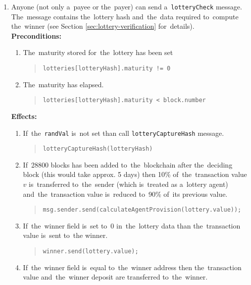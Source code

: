 \documentclass[a4paper]{article}
\begin{document}
\begin{enumerate}
        \item Anyone (not only a~payee or the~payer) can send a~\texttt{lotteryCheck} message. The~message contains
            the~lottery hash and~the~data required to~compute the~winner (see Section \ref{sec:lottery-verification}
            for~details).\\
            \textbf{Preconditions:}
            \begin{enumerate}
            \item The~maturity stored for~the~lottery has been set
              \begin{quote}
                \verb|lotteries[lotteryHash].maturity != 0|
              \end{quote}
            \item The~maturity has elapsed.
	      \begin{quote}
                \verb|lotteries[lotteryHash].maturity < block.number|
              \end{quote}
	    \end{enumerate}
	    \textbf{Effects:}
	    \begin{enumerate}
            \item If~the~\texttt{randVal} is~not set than call \texttt{lotteryCaptureHash} message.
              \begin{quote}
                \verb|lotteryCaptureHash(lotteryHash)|
              \end{quote}
            \item If~28800 blocks has been added to~the~blockchain after the~deciding block (this would take
              approx. 5 days) then 10\% of~the~transaction value $v$ is~transferred to~the~sender (which is~treated
              as a~lottery agent) and~the~transaction value is~reduced to~90\% of~its previous value.
              \begin{quote}
                \verb|msg.sender.send(calculateAgentProvision(lottery.value));|
              \end{quote}
            \item If~the~winner field is~set to~0 in~the~lottery data than the~transaction value is~sent to~the
              winner.
              \begin{quote}
                \verb|winner.send(lottery.value);|
              \end{quote}
            \item If~the~winner field is~equal to~the~winner address then the~transaction value and~the~winner
              deposit are transferred to~the~winner.

\end{enumerate}
\end{enumerate}
\end{document}
